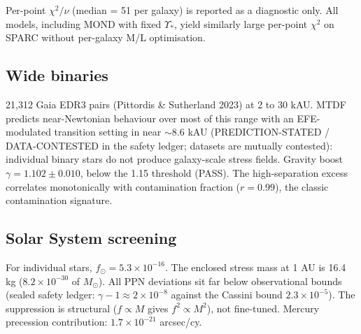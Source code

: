 \documentclass[11pt,a4paper]{article}
\begin{document}
Per-point $\chi^2/\nu$ (median = 51 per galaxy) is reported as a diagnostic only. All models, including MOND with fixed $\Upsilon_*$, yield similarly large per-point $\chi^2$ on SPARC without per-galaxy M/\allowbreak{}L optimisation.

\subsection{Wide binaries}
21,312 Gaia EDR3 pairs (Pittordis \& Sutherland 2023) at 2 to 30 kAU. MTDF predicts near-Newtonian behaviour over most of this range with an EFE-modulated transition setting in near $\sim 8.6$ kAU (PREDICTION-STATED / DATA-CONTESTED in the safety ledger; datasets are mutually contested): individual binary stars do not produce galaxy-scale stress fields. Gravity boost $\gamma = 1.102 \pm 0.010$, below the 1.15 threshold (PASS). The high-separation excess correlates monotonically with contamination fraction ($r = 0.99$), the classic contamination signature.

\subsection{Solar System screening}
For individual stars, $f_\odot = 5.3 \times 10^{-16}$. The enclosed stress mass at 1 AU is 16.4 kg ($8.2 \times 10^{-30}$ of $M_\odot$). All PPN deviations sit far below observational bounds (sealed safety ledger: $\gamma - 1 \approx 2\times10^{-8}$ against the Cassini bound $2.3\times10^{-5}$). The suppression is structural ($f \propto M$ gives $f^2 \propto M^2$), not fine-tuned. Mercury precession contribution: $1.7 \times 10^{-21}$ arcsec/\allowbreak{}cy.
\end{document}
